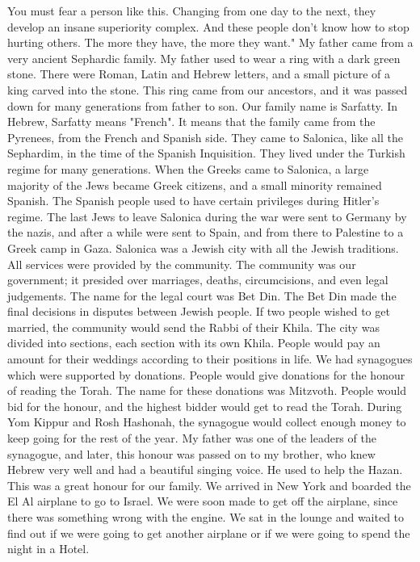 You must fear a person like this.
Changing from one day to the next, they develop an insane superiority complex.
And these people don't know how to stop hurting others.
The more they have, the more they want." 
My father came from a very ancient Sephardic family.
My father used to wear a ring with a dark green stone.
There were Roman, Latin and Hebrew letters, and a small picture of a king carved into the stone.
This ring came from our ancestors, and it was passed down for many generations from father to son. Our family name is Sarfatty.
In Hebrew, Sarfatty means "French". It means that the family came from the Pyrenees, from the French and Spanish side.
They came to Salonica, like all the Sephardim, in the time of the Spanish Inquisition.
They lived under the Turkish regime for many generations.
When the Greeks came to Salonica, a large majority of the Jews became Greek citizens, and a small minority remained Spanish.
The Spanish people used to have certain privileges during Hitler's regime.
The last Jews to leave Salonica during the war were sent to Germany by the nazis, and after a while were sent to Spain, and from there to Palestine to a Greek camp in Gaza.
Salonica was a Jewish city with all the Jewish traditions. 
All services were provided by the community. The community was our government; it presided over marriages, deaths, circumcisions, and even legal judgements.
The name for the legal court was Bet Din.
The Bet Din made the final decisions in disputes between Jewish people. 
If two people wished to get married, the community would send the Rabbi of their Khila.
The city was divided into sections, each section with its own Khila.
People would pay an amount for their weddings according to their positions in life.
We had synagogues which were supported by donations.
People would give donations for the honour of reading the Torah.
The name for these donations was Mitzvoth.
People would bid for the honour, and the highest bidder would get to read the Torah.
During Yom Kippur and Rosh Hashonah, the synagogue would collect enough money to keep going for the rest of the year.
My father was one of the leaders of the synagogue, and later, this honour was passed on to my brother, who knew Hebrew very well and had a beautiful singing voice.
He used to help the Hazan. 
This was a great honour for our family. 
We arrived in New York and boarded the El Al airplane to go to Israel.
We were soon made to get off the airplane, since there  was something wrong with the engine.
We sat in the lounge and waited to find out if we were going to get another airplane or if we were going to spend the night in a Hotel.
